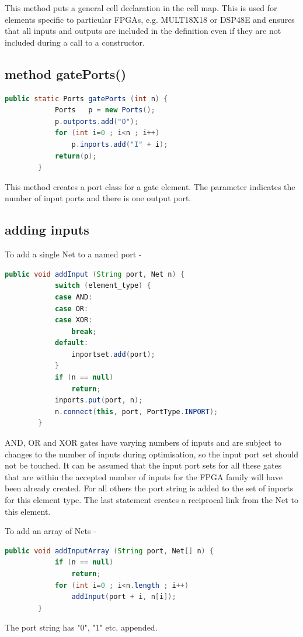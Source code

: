     This method puts a general cell declaration in the cell map. This
    is used for elements specific to particular FPGAs, e.g. MULT18X18
    or DSP48E and ensures that all inputs and outputs are included in
    the definition even if they are not included during a call to
    a constructor.

\subsection{method gatePorts()}

    \begin{lstlisting}[gobble=4, language=java]
        public static Ports gatePorts (int n) {
            Ports   p = new Ports();
            p.outports.add("O");
            for (int i=0 ; i<n ; i++)
                p.inports.add("I" + i);
            return(p);
        }
    \end{lstlisting}

    This method creates a port class for a gate element. The parameter
    indicates the number of input ports and there is one output port.

\subsection{adding inputs}

    To add a single Net to a named port -
    \begin{lstlisting}[gobble=4, language=java]
        public void addInput (String port, Net n) {
            switch (element_type) {
            case AND:
            case OR:
            case XOR:
                break;
            default:
                inportset.add(port);
            }
            if (n == null)
                return;
            inports.put(port, n);
            n.connect(this, port, PortType.INPORT);
        }
    \end{lstlisting}
    AND, OR and XOR gates have varying numbers of inputs and are subject
    to changes to the number of inputs during optimisation, so the input
    port set should not be touched. It can be assumed that the input
    port sets for all these gates that are within the accepted number of
    inputs for the FPGA family will have been already created. For all
    others the port string is added to the set of inports for this
    element type. The last statement creates a reciprocal link from the
    Net to this element.

    To add an array of Nets -
    \begin{lstlisting}[gobble=4, language=java]
        public void addInputArray (String port, Net[] n) {
            if (n == null)
                return;
            for (int i=0 ; i<n.length ; i++)
                addInput(port + i, n[i]);
        }
    \end{lstlisting}
    The port string has "0", "1" etc. appended.

